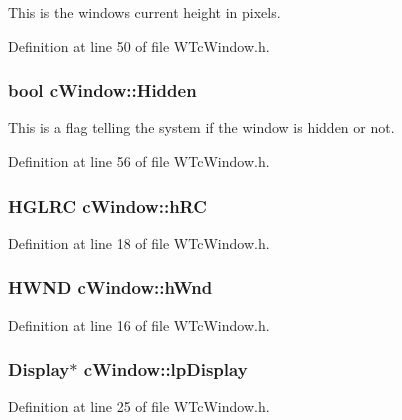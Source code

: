 This is the windows current height in pixels. 



Definition at line 50 of file WTcWindow.h.

\hypertarget{classc_window_aaff5335e44eb273754bc883b1a4a0dfc}{
\subsubsection[{Hidden}]{\setlength{\rightskip}{0pt plus 5cm}bool {\bf cWindow::Hidden}}}
\label{classc_window_aaff5335e44eb273754bc883b1a4a0dfc}


This is a flag telling the system if the window is hidden or not. 



Definition at line 56 of file WTcWindow.h.

\hypertarget{classc_window_ad024922891b97efb71adae9ff347eb25}{
\subsubsection[{hRC}]{\setlength{\rightskip}{0pt plus 5cm}HGLRC {\bf cWindow::hRC}}}
\label{classc_window_ad024922891b97efb71adae9ff347eb25}


Definition at line 18 of file WTcWindow.h.

\hypertarget{classc_window_a5a92dcb33f9265f928a072bd697ee183}{
\subsubsection[{hWnd}]{\setlength{\rightskip}{0pt plus 5cm}HWND {\bf cWindow::hWnd}}}
\label{classc_window_a5a92dcb33f9265f928a072bd697ee183}


Definition at line 16 of file WTcWindow.h.

\hypertarget{classc_window_ab092a4b04f6335f9244e03442abebad9}{
\subsubsection[{lpDisplay}]{\setlength{\rightskip}{0pt plus 5cm}Display$\ast$ {\bf cWindow::lpDisplay}}}
\label{classc_window_ab092a4b04f6335f9244e03442abebad9}


Definition at line 25 of file WTcWindow.h.

